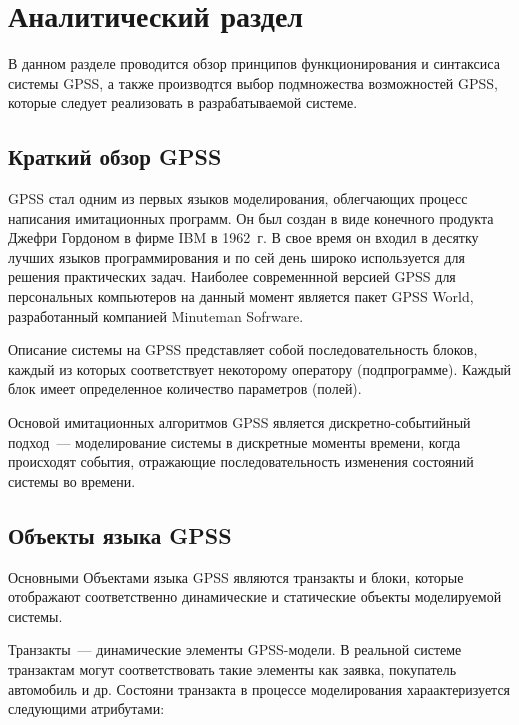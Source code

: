 \chapter{Аналитический раздел}
\label{cha:analysis}

В данном разделе проводится обзор принципов функционирования и синтаксиса системы GPSS, а также производтся выбор подмножества возможностей GPSS, которые следует реализовать в разрабатываемой системе.

\section{Краткий обзор GPSS}

GPSS стал одним из первых языков моделирования, облегчающих процесс написания имитационных программ. Он был создан в виде конечного продукта Джефри Гордоном в фирме IBM в 1962~г.\cite{ImitGPSS} В свое время он входил в десятку лучших языков программирования и по сей день широко используется для решения практических задач. Наиболее современнной версией GPSS для персональных компьютеров на данный момент является пакет GPSS World, разработанный компанией Minuteman Sofrware.

Описание системы на GPSS представляет собой последовательность блоков,
каждый из которых соответствует некоторому оператору (подпрограмме). Каждый блок
имеет определенное количество параметров (полей).


Основой имитационных алгоритмов GPSS является дискретно-событийный подход~--- моделирование сис­темы в дискретные моменты времени, когда происходят события, от­ражающие последовательность изменения состояний системы во времени.\cite{ImitGPSS}

\section{Объекты языка GPSS}

Основными Объектами языка GPSS являются транзакты и блоки, которые отображают соответственно динамические и статические объекты моделируемой системы.

Транзакты~--- динамические элементы GPSS-модели. В реальной системе транзактам могут соответствовать такие элементы как заявка, покупатель автомобиль и др. Состояни транзакта в процессе моделирования хараактеризуется следующими атрибутами:

